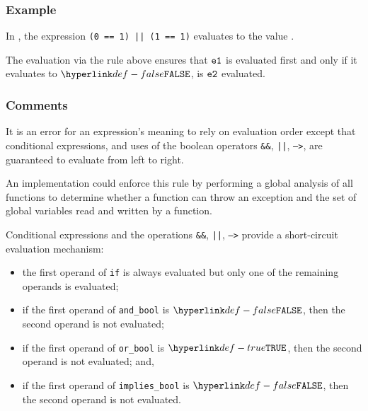 \subsubsection{Example}
In , the expression \texttt{(0 == 1) || (1 == 1)} evaluates to the value \True.

\begin{mathpar}
\end{mathpar}

The evaluation via the rule above ensures that $\veone$ is evaluated first and only if
it evaluates to $\False$, is $\vetwo$ evaluated.

\subsubsection{Comments}


It is an error for an expression’s meaning to rely on
evaluation order except that conditional expressions, and uses of the boolean
operators \texttt{\&\&}, \texttt{||}, \texttt{-->}, are guaranteed to evaluate
from left to right.


An implementation could enforce this rule by performing a global analysis of
all functions to determine whether a function can throw an exception and the
set of global variables read and written by a function.

Conditional expressions and the operations \texttt{\&\&}, \texttt{||},
\texttt{-->} provide a short-circuit evaluation mechanism:

\begin{itemize}
\item the first operand of \texttt{if} is always evaluated but only one of the
remaining operands is evaluated;
\item if the first operand of \texttt{and\_bool} is $\False$, then the second operand is not evaluated;
\item if the first operand of \texttt{or\_bool} is $\True$, then the second operand is not evaluated; and,
\item if the first operand of \texttt{implies\_bool} is $\False$, then the
second operand is not evaluated.
\end{itemize}

